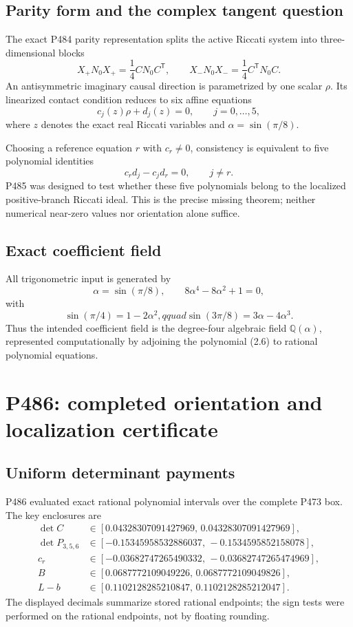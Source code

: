 \documentclass[11pt,a4paper,openany]{report}
\newcommand{\Q}{\mathbb Q}
\begin{document}
\section{Parity form and the complex tangent question}

The exact P484 parity representation splits the active Riccati system into
three-dimensional blocks
\[
 X_+N_0X_+=\frac14CN_0C^{\mathsf T},\qquad
 X_-N_0X_-=\frac14C^{\mathsf T}N_0C.                               \tag{2.3}
\]
An antisymmetric imaginary causal direction is parametrized by one scalar
\(\rho\). Its linearized contact condition reduces to six affine equations
\[
 c_j(z)\rho+d_j(z)=0,\qquad j=0,\ldots,5,                          \tag{2.4}
\]
where \(z\) denotes the exact real Riccati variables and
\(\alpha=\sin(\pi/8)\).

Choosing a reference equation \(r\) with \(c_r\ne0\), consistency is
equivalent to five polynomial identities
\[
 c_r d_j-c_jd_r=0,\qquad j\ne r.                                  \tag{2.5}
\]
P485 was designed to test whether these five polynomials belong to the
localized positive-branch Riccati ideal. This is the precise missing theorem;
neither numerical near-zero values nor orientation alone suffice.

\section{Exact coefficient field}

All trigonometric input is generated by
\[
 \alpha=\sin(\pi/8),\qquad
 8\alpha^4-8\alpha^2+1=0,                                         \tag{2.6}
\]
with
\[
 \sin(\pi/4)=1-2\alpha^2,qquad
 \sin(3\pi/8)=3\alpha-4\alpha^3.                                 \tag{2.7}
\]
Thus the intended coefficient field is the degree-four algebraic field
\(\Q(\alpha)\), represented computationally by adjoining the polynomial
(2.6) to rational polynomial equations.

\chapter{P486: completed orientation and localization certificate}

\section{Uniform determinant payments}

P486 evaluated exact rational polynomial intervals over the complete P473
box. The key enclosures are
\begin{align*}
 \det C &\in [0.04328307091427969,\,0.04328307091427969],\\
 \det P_{3,5,6}
 &\in[-0.15345958532886037,\,-0.1534595852158078],\\
 c_r&\in[-0.03682747265490332,\,-0.03682747265474969],\\
 B&\in[0.0687772109049226,\,0.0687772109049826],\\
 L-b&\in[0.1102128285210847,\,0.1102128285212047].                 \tag{3.1}
\end{align*}
The displayed decimals summarize stored rational endpoints; the sign tests
were performed on the rational endpoints, not by floating rounding.
\end{document}
